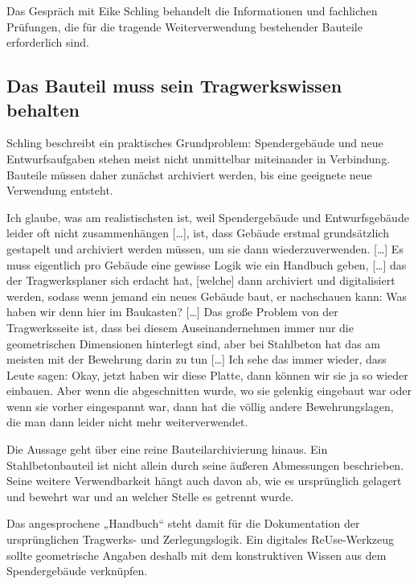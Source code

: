 \label{anlage:interview-schling}

Das Gespräch mit Eike Schling behandelt die Informationen und fachlichen Prüfungen, die für die tragende Weiterverwendung bestehender Bauteile erforderlich sind.

\subsection{Das Bauteil muss sein Tragwerkswissen behalten}

Schling beschreibt ein praktisches Grundproblem: Spendergebäude und neue Entwurfsaufgaben stehen meist nicht unmittelbar miteinander in Verbindung. Bauteile müssen daher zunächst archiviert werden, bis eine geeignete neue Verwendung entsteht.

\begin{Blockquote}
Ich glaube, was am realistischsten ist, weil Spendergebäude und Entwurfsgebäude leider oft nicht zusammenhängen […], ist, dass Gebäude erstmal grundsätzlich gestapelt und archiviert werden müssen, um sie dann wiederzuverwenden. […] Es muss eigentlich pro Gebäude eine gewisse Logik wie ein Handbuch geben, […] das der Tragwerksplaner sich erdacht hat, [welche] dann archiviert und digitalisiert werden, sodass wenn jemand ein neues Gebäude baut, er nachschauen kann: Was haben wir denn hier im Baukasten? […] Das große Problem von der Tragwerksseite ist, dass bei diesem Auseinandernehmen immer nur die geometrischen Dimensionen hinterlegt sind, aber bei Stahlbeton hat das am meisten mit der Bewehrung darin zu tun […] Ich sehe das immer wieder, dass Leute sagen: Okay, jetzt haben wir diese Platte, dann können wir sie ja so wieder einbauen. Aber wenn die abgeschnitten wurde, wo sie gelenkig eingebaut war oder wenn sie vorher eingespannt war, dann hat die völlig andere Bewehrungslagen, die man dann leider nicht mehr weiterverwendet.
\end{Blockquote}

Die Aussage geht über eine reine Bauteilarchivierung hinaus. Ein Stahlbetonbauteil ist nicht allein durch seine äußeren Abmessungen beschrieben. Seine weitere Verwendbarkeit hängt auch davon ab, wie es ursprünglich gelagert und bewehrt war und an welcher Stelle es getrennt wurde.

Das angesprochene „Handbuch“ steht damit für die Dokumentation der ursprünglichen Tragwerks- und Zerlegungslogik. Ein digitales ReUse-Werkzeug sollte geometrische Angaben deshalb mit dem konstruktiven Wissen aus dem Spendergebäude verknüpfen.


